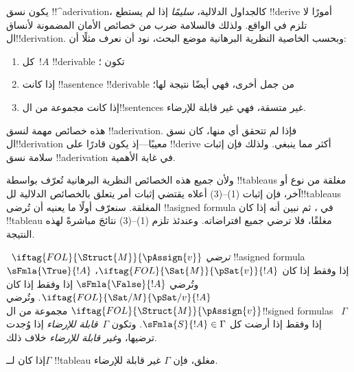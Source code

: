 \documentclass[../../../include/open-logic-section]{subfiles}
\begin{document}
      {}
      {}
      

\begin{explain}
يكون نسق !!^a{derivation}، كالجداول الدلالية، \emph{سليمًا} إذا لم يستطع
!!{derive} أمورًا لا تلزم في الواقع. ولذلك فالسلامة ضرب من خصائص الأمان
المضمونة لأنساق ال!!{derivation}. وبحسب الخاصية النظرية البرهانية موضع
البحث، نود أن نعرف مثلًا أن:
\begin{enumerate}
\item كل~$!A$ !!{derivable} تكون ؛
\item إذا كانت !!a{sentence} !!{derivable} من جمل أخرى، فهي أيضًا نتيجة لها؛
\item إذا كانت مجموعة من ال!!{sentence}s غير متسقة، فهي غير قابلة للإرضاء.
\end{enumerate}
هذه خصائص مهمة لنسق !!a{derivation}. فإذا لم تتحقق أي منها، كان نسق
ال!!{derivation} معيبًا---إذ يكون قادرًا على !!{derive} أكثر مما ينبغي.
ولذلك فإن إثبات سلامة نسق !!a{derivation} في غاية الأهمية.

ولأن جميع هذه الخصائص النظرية البرهانية تُعرّف بواسطة !!{tableau}s مغلقة
من نوع أو آخر، فإن إثبات (1)--(3) أعلاه يقتضي إثبات أمر يتعلق بالخصائص
الدلالية لل!!{tableau}s المغلقة. سنعرّف أولًا ما يعنيه أن تُرضى
!!a{signed formula} في ، ثم نبين أنه إذا كان
!!{tableau} مغلقًا، فلا  ترضي جميع افتراضاته.
وعندئذ تلزم (1)--(3) نتائجَ مباشرةً لهذه النتيجة.
\end{explain}

\begin{defn}
~$\iftag{FOL}{\Struct{M}}{\pAssign{v}}$
\emph{ترضي}
!!a{signed formula} $\sFmla{\True}{!A}$ إذا وفقط إذا كان
$\iftag{FOL}{\Sat{M}}{\pSat{v}}{!A}$، وتُرضي
$\sFmla{\False}{!A}$ إذا وفقط إذا كان
$\iftag{FOL}{\Sat/{M}}{\pSat/{v}}{!A}$. وتُرضي
$\iftag{FOL}{\Struct{M}}{\pAssign{v}}$ مجموعة من ال!!{signed formula}s
~$\Gamma$ إذا وفقط إذا أرضت كل $\sFmla{S}{!A} \in \Gamma$. وتكون
$\Gamma$~\emph{قابلة للإرضاء} إذا وُجدت
 ترضيها، و\emph{غير قابلة
للإرضاء} خلاف ذلك.
\end{defn}

\begin{thm}[السلامة]
  إذا كان لــ$\Gamma$ !!{tableau} مغلق، فإن $\Gamma$ غير قابلة للإرضاء.
\end{thm}
\end{document}
